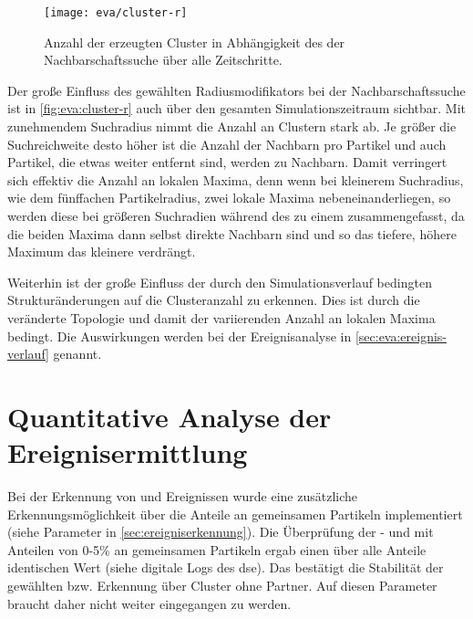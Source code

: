 \begin{figure}
	\texttt{[image: eva/cluster-r]}
	\caption{Anzahl der erzeugten Cluster in Abhängigkeit des   der Nachbarschaftssuche über alle Zeitschritte.}\label{fig:eva:cluster-r}
\end{figure}

Der große Einfluss des gewählten Radiusmodifikators bei der Nachbarschaftssuche ist in \autoref{fig:eva:cluster-r} auch über den gesamten Simulationszeitraum sichtbar. Mit zunehmendem Suchradius nimmt die Anzahl an Clustern stark ab. Je größer die Suchreichweite desto höher ist die Anzahl der Nachbarn pro Partikel und auch Partikel, die etwas weiter entfernt sind, werden zu Nachbarn. Damit verringert sich effektiv die Anzahl an lokalen Maxima, denn wenn bei kleinerem Suchradius, wie dem fünffachen Partikelradius, zwei lokale Maxima nebeneinanderliegen, so werden diese bei größeren Suchradien während des \SECC zu einem zusammengefasst, da die beiden Maxima dann selbst direkte Nachbarn sind und so das tiefere, höhere Maximum das kleinere verdrängt.

Weiterhin ist der große Einfluss der durch den Simulationsverlauf bedingten Strukturänderungen auf die Clusteranzahl zu erkennen. Dies ist durch die veränderte Topologie und damit der variierenden Anzahl an lokalen Maxima bedingt. Die Auswirkungen werden bei der Ereignisanalyse in \autoref{sec:eva:ereignis-verlauf} genannt.

\section{Quantitative Analyse der Ereignisermittlung}\label{eva:quantitativ}

Bei der Erkennung von  und  Ereignissen wurde eine zusätzliche Erkennungsmöglichkeit über die Anteile an gemeinsamen Partikeln implementiert (siehe Parameter in \autoref{sec:ereigniserkennung}). Die Überprüfung der - und  mit Anteilen von 0-5\% an gemeinsamen Partikeln ergab einen über alle Anteile identischen Wert (siehe digitale Logs des \gls{dse}). Das bestätigt die Stabilität der gewählten  bzw.  Erkennung über Cluster ohne Partner. Auf diesen Parameter braucht daher nicht weiter eingegangen zu werden.

